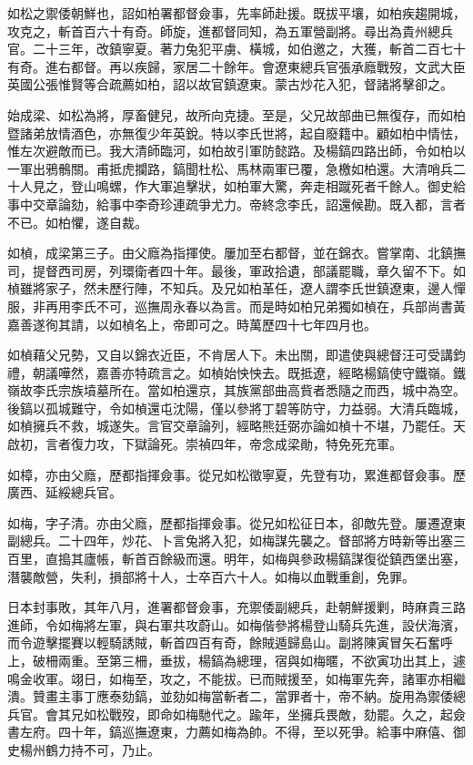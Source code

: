 \begin{pinyinscope}
如松之禦倭朝鮮也，詔如柏署都督僉事，先率師赴援。既拔平壤，如柏疾趨開城，攻克之，斬首百六十有奇。師旋，進都督同知，為五軍營副將。尋出為貴州總兵官。二十三年，改鎮寧夏。著力兔犯平虜、橫城，如伯邀之，大獲，斬首二百七十有奇。進右都督。再以疾歸，家居二十餘年。會遼東總兵官張承廕戰歿，文武大臣英國公張惟賢等合疏薦如柏，詔以故官鎮遼東。蒙古炒花入犯，督諸將擊卻之。

始成梁、如松為將，厚畜健兒，故所向克捷。至是，父兄故部曲已無復存，而如柏暨諸弟放情酒色，亦無復少年英銳。特以李氏世將，起自廢籍中。顧如柏中情怯，惟左次避敵而已。我大清師臨河，如柏故引軍防懿路。及楊鎬四路出師，令如柏以一軍出鴉鶻關。甫抵虎攔路，鎬聞杜松、馬林兩軍已覆，急檄如柏還。大清哨兵二十人見之，登山鳴螺，作大軍追擊狀，如柏軍大驚，奔走相蹴死者千餘人。御史給事中交章論劾，給事中李奇珍連疏爭尤力。帝終念李氏，詔還候勘。既入都，言者不已。如柏懼，遂自裁。

如楨，成梁第三子。由父廕為指揮使。屢加至右都督，並在錦衣。嘗掌南、北鎮撫司，提督西司房，列環衛者四十年。最後，軍政拾遺，部議罷職，章久留不下。如楨雖將家子，然未歷行陣，不知兵。及兄如柏革任，遼人謂李氏世鎮遼東，邊人憚服，非再用李氏不可，巡撫周永春以為言。而是時如柏兄弟獨如楨在，兵部尚書黃嘉善遂徇其請，以如楨名上，帝即可之。時萬歷四十七年四月也。

如楨藉父兄勢，又自以錦衣近臣，不肯居人下。未出關，即遣使與總督汪可受講鈞禮，朝議嘩然，嘉善亦特疏言之。如楨始怏怏去。既抵遼，經略楊鎬使守鐵嶺。鐵嶺故李氏宗族墳墓所在。當如柏還京，其族黨部曲高貲者悉隨之而西，城中為空。後鎬以孤城難守，令如楨還屯沈陽，僅以參將丁碧等防守，力益弱。大清兵臨城，如楨擁兵不救，城遂失。言官交章論列，經略熊廷弼亦論如楨十不堪，乃罷任。天啟初，言者復力攻，下獄論死。崇禎四年，帝念成梁勛，特免死充軍。

如樟，亦由父廕，歷都指揮僉事。從兄如松徵寧夏，先登有功，累進都督僉事。歷廣西、延綏總兵官。

如梅，字子清。亦由父廕，歷都指揮僉事。從兄如松征日本，卻敵先登。屢遷遼東副總兵。二十四年，炒花、卜言兔將入犯，如梅謀先襲之。督部將方時新等出塞三百里，直搗其廬帳，斬首百餘級而還。明年，如梅與參政楊鎬謀復從鎮西堡出塞，潛襲敵營，失利，損部將十人，士卒百六十人。如梅以血戰重創，免罪。

日本封事敗，其年八月，進署都督僉事，充禦倭副總兵，赴朝鮮援剿，時麻貴三路進師，令如梅將左軍，與右軍共攻蔚山。如梅偕參將楊登山騎兵先進，設伏海濱，而令遊擊擺賽以輕騎誘賊，斬首四百有奇，餘賊遁歸島山。副將陳寅冒矢石奮呼上，破柵兩重。至第三柵，垂拔，楊鎬為總理，宿與如梅暱，不欲寅功出其上，遽鳴金收軍。翊日，如梅至，攻之，不能拔。已而賊援至，如梅軍先奔，諸軍亦相繼潰。贊畫主事丁應泰劾鎬，並劾如梅當斬者二，當罪者十，帝不納。旋用為禦倭總兵官。會其兄如松戰歿，即命如梅馳代之。踰年，坐擁兵畏敵，劾罷。久之，起僉書左府。四十年，鎬巡撫遼東，力薦如梅為帥。不得，至以死爭。給事中麻僖、御史楊州鶴力持不可，乃止。


\end{pinyinscope}

